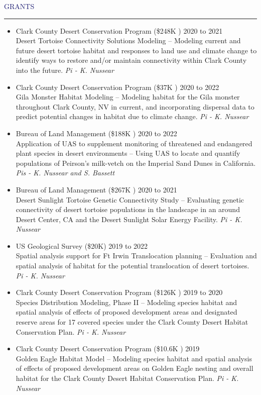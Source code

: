\documentclass{resume} %
\renewenvironment{rSection}[1]{
\sectionskip
\textcolor{MidnightBlue}{\MakeUppercase{#1}}
\sectionlineskip
\hrule
\begin{list}{}{
\setlength{\leftmargin}{1.5em}
}
\item[]
}{
\end{list}
}
\begin{document}
\begin{rSection}{Grants}{}
\begin{itemize}
\item Clark County Desert Conservation Program (\$248K
) \hfill 2020 to 2021 \\
Desert Tortoise Connectivity Solutions Modeling
 -- Modeling current and future desert tortoise habitat and responses to land use and climate change to identify ways to restore and/or maintain connectivity within Clark County into the future. \textit{Pi - K. Nussear}

\item Clark County Desert Conservation Program (\$37K
) \hfill 2020 to 2022 \\
Gila Monster Habitat Modeling
 -- Modeling habitat for the Gila monster throughout Clark County, NV in current, and incorporating dispersal data to predict potential changes in habitat due to climate change. \textit{Pi - K. Nussear}

\item Bureau of Land Management (\$188K
) \hfill 2020 to 2022 \\
Application of UAS to supplement monitoring of threatened and endangered plant species in desert environments
-- Using UAS to locate and quantify populations of Peirson's milk-vetch on the Imperial Sand Dunes in California. \textit{Pis - K. Nussear and S. Bassett}

\item Bureau of Land Management (\$267K 
) \hfill 2020 to 2021 \\
Desert Sunlight Tortoise Genetic Connectivity Study
 -- Evaluating genetic connectivity of desert tortoise populations in the landscape in an around Desert Center, CA and the Desert Sunlight Solar Energy Facility. \textit{Pi - K. Nussear}

\item US Geological Survey (\$20K)
 \hfill 2019 to 2022 \\
Spatial analysis support for Ft Irwin Translocation planning
-- Evaluation and spatial analysis of habitat for the potential translocation of desert tortoises. \textit{Pi - K. Nussear}

\item Clark County Desert Conservation Program (\$126K
) \hfill 2019 to 2020 \\
Species Distribution Modeling, Phase II
 -- Modeling species habitat and spatial analysis of effects of proposed development areas and designated reserve areas for 17 covered species under the Clark County Desert Habitat Conservation Plan. \textit{Pi - K. Nussear}
 \item Clark County Desert Conservation Program (\$10.6K
) \hfill 2019\\
Golden Eagle Habitat Model 
 -- Modeling species habitat and spatial analysis of effects of proposed development areas on Golden Eagle nesting and overall habitat for the Clark County Desert Habitat Conservation Plan. \textit{Pi - K. Nussear}
 

\end{itemize}
\end{rSection}
\end{document}
